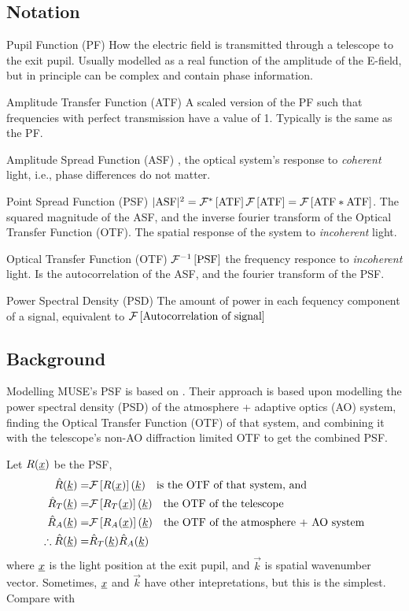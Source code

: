 
\subsection{Notation}
\begin{description}
	\item{Pupil Function (PF)} How the electric field is transmitted through a telescope to the exit pupil. Usually modelled as a real function of the amplitude of the E-field, but in principle can be complex and contain phase information.
	\item{Amplitude Transfer Function (ATF)} A scaled version of the PF such that frequencies with perfect transmission have a value of 1. Typically is the same as the PF.
	\item{Amplitude Spread Function (ASF)} , the optical system's response to \emph{coherent} light, i.e., phase differences do not matter.
	\item{Point Spread Function (PSF)} $|\textrm{ASF}|^2 = \mathcal{F}^{*}\left[ \textrm{ATF} \right]\mathcal{F}\left[ \textrm{ATF} \right] = \mathcal{F}\left[ \textrm{ATF} * \textrm{ATF} \right]$. The squared magnitude of the ASF, and the inverse fourier transform of the Optical Transfer Function (OTF). The spatial response of the system to \emph{incoherent} light.
	\item{Optical Transfer Function (OTF)} $\mathcal{F}^{-1}\left[ \textrm{PSF} \right]$ the frequency responce to \emph{incoherent} light. Is the autocorrelation of the ASF, and the fourier transform of the PSF.
	\item{Power Spectral Density (PSD)} The amount of power in each fequency component of a signal, equivalent to $\mathcal{F}\left[ \textrm{Autocorrelation of signal} \right]$

\end{description}



\subsection{Background}

Modelling MUSE's PSF is based on \cite{Fetick19}. Their approach is based upon modelling the power spectral density (PSD) of the atmosphere + adaptive optics (AO) system, finding the Optical Transfer Function (OTF) of that system, and combining it with the telescope's non-AO diffraction limited OTF to get the combined PSF.

Let $R(\underline{x})$ be the PSF,
\begin{align}
	\hat{R}(\underline{k}) =& \mathcal{F}\left[ R(\underline{x}) \right](\underline{k}) \quad \textrm{is the OTF of that system, and} \nonumber \\
	\hat{R}_T(\underline{k}) =& \mathcal{F}\left[ R_T(\underline{x}) \right](\underline{k}) \quad \textrm{the OTF of the telescope} \nonumber \\
	\hat{R}_A(\underline{k}) =& \mathcal{F}\left[ R_A(\underline{x}) \right](\underline{k}) \quad \textrm{the OTF of the atmosphere + AO system} \nonumber \\
	\therefore \hat{R}(\underline{k}) =& \hat{R}_T(\underline{k}) \hat{R}_A(\underline{k})
	\label{eq:full_otf}
\end{align}
where $\underline{x}$ is the light position at the exit pupil, and $\vec{k}$ is spatial wavenumber vector. Sometimes, $\underline{x}$ and $\vec{k}$ have other intepretations, but this is the simplest. Compare with \cite[eq 5, eq 9]{Fetick19}

